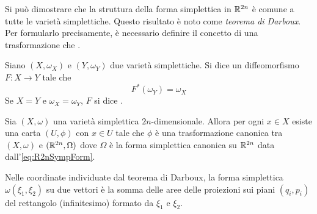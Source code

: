 Si può dimostrare che la struttura della forma simplettica in $\mathbb{R}^{2n}$ è comune a tutte le varietà simplettiche. Questo risultato è noto come \emph{teorema di Darboux}. Per formularlo precisamente, è necessario definire il concetto di una trasformazione che .

\begin{definition}
  Siano $(X, \omega_X)$ e $(Y, \omega_Y)$ due varietà simplettiche. Si dice  un diffeomorfismo $F:X\to Y$ tale che 
  \begin{equation*}
    F^*(\omega_Y) = \omega_X
  \end{equation*} 
  Se $X = Y$ e $\omega_X = \omega_Y$, $F$ si dice .
\end{definition}

\begin{theorem}[Darboux]
  Sia $(X,\omega)$ una varietà simplettica $2n$-dimensionale. Allora per ogni $x \in X$ esiste una carta $(U,\phi)$ con $x \in U$ tale che $\phi$ è una trasformazione canonica tra $(X,\omega)$ e $(\mathbb{R}^{2n}, \Omega)$ dove $\Omega$ è la forma simplettica canonica su $\mathbb{R}^{2n}$ data dall'\autoref{eq:R2nSympForm}.
\end{theorem}
\begin{remark}
  Nelle coordinate individuate dal teorema di Darboux, la forma simplettica $\omega(\xi_1,\xi_2)$ su due vettori è la somma delle aree delle  proiezioni sui piani $(q_i, p_i)$ del rettangolo (infinitesimo) formato da $\xi_1$ e $\xi_2$.
\end{remark}

